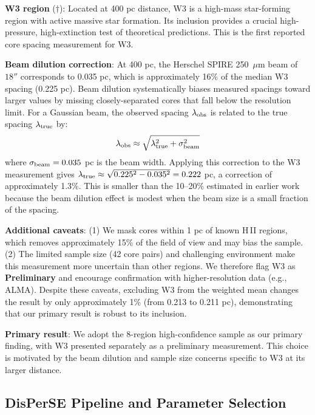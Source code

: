 \documentclass[11pt,a4paper]{article}
\begin{document}
\noindent\textbf{W3 region} ($\dagger$): Located at 400 pc distance, W3 is a high-mass star-forming region with active massive star formation. Its inclusion provides a crucial high-pressure, high-extinction test of theoretical predictions. This is the first reported core spacing measurement for W3.

\textbf{Beam dilution correction}: At 400 pc, the Herschel SPIRE 250~$\mu$m beam of $18''$ corresponds to 0.035 pc, which is approximately 16\% of the median W3 spacing (0.225 pc). Beam dilution systematically biases measured spacings toward larger values by missing closely-separated cores that fall below the resolution limit. For a Gaussian beam, the observed spacing $\lambda_{\rm obs}$ is related to the true spacing $\lambda_{\rm true}$ by:
\begin{equation}
\lambda_{\rm obs} \approx \sqrt{\lambda_{\rm true}^2 + \sigma_{\rm beam}^2}
\end{equation}
where $\sigma_{\rm beam} = 0.035$ pc is the beam width. Applying this correction to the W3 measurement gives $\lambda_{\rm true} \approx \sqrt{0.225^2 - 0.035^2} = 0.222$ pc, a correction of approximately 1.3\%. This is smaller than the 10--20\% estimated in earlier work because the beam dilution effect is modest when the beam size is a small fraction of the spacing.

\textbf{Additional caveats}: (1) We mask cores within 1 pc of known H\,{\scriptsize II} regions, which removes approximately 15\% of the field of view and may bias the sample. (2) The limited sample size (42 core pairs) and challenging environment make this measurement more uncertain than other regions. We therefore flag W3 as \textbf{Preliminary} and encourage confirmation with higher-resolution data (e.g., ALMA). Despite these caveats, excluding W3 from the weighted mean changes the result by only approximately 1\% (from 0.213 to 0.211 pc), demonstrating that our primary result is robust to its inclusion.

\textbf{Primary result}: We adopt the 8-region high-confidence sample as our primary finding, with W3 presented separately as a preliminary measurement. This choice is motivated by the beam dilution and sample size concerns specific to W3 at its larger distance.

\subsection{DisPerSE Pipeline and Parameter Selection}
\end{document}

